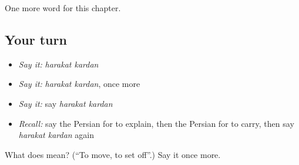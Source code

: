 \begin{grammarlens}[title={What you've built}]
One more word for this chapter.
\end{grammarlens}

\subsection*{Your turn}
\begin{itemize}
\raggedright
  \item \emph{Say it:} \emph{harakat kardan}
  \item \emph{Say it:} \emph{harakat kardan}, once more
  \item \emph{Say it:} say \emph{harakat kardan}
  \item \emph{Recall:} say the Persian for to explain, then the Persian for to carry, then say \emph{harakat kardan} again
\end{itemize}

\begin{tcolorbox}[breakable,colback=teal!4,colframe=teal!35!black,title={Before you move on}]
What does   mean? (\textquotedblleft{}To move, to set off\textquotedblright{}.) Say it once more.
\end{tcolorbox}
